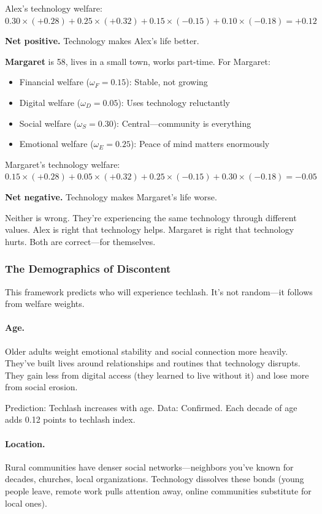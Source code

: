 Alex's technology welfare: $0.30 \times (+0.28) + 0.25 \times (+0.32) + 0.15 \times (-0.15) + 0.10 \times (-0.18) = +0.12$

\textbf{Net positive.} Technology makes Alex's life better.

\textbf{Margaret} is 58, lives in a small town, works part-time. For Margaret:
\begin{itemize}
    \item Financial welfare ($\omega_F = 0.15$): Stable, not growing
    \item Digital welfare ($\omega_D = 0.05$): Uses technology reluctantly
    \item Social welfare ($\omega_S = 0.30$): Central---community is everything
    \item Emotional welfare ($\omega_E = 0.25$): Peace of mind matters enormously
\end{itemize}

Margaret's technology welfare: $0.15 \times (+0.28) + 0.05 \times (+0.32) + 0.25 \times (-0.15) + 0.30 \times (-0.18) = -0.05$

\textbf{Net negative.} Technology makes Margaret's life worse.

Neither is wrong. They're experiencing the same technology through different 
values. Alex is right that technology helps. Margaret is right that technology 
hurts. Both are correct---for themselves.

\subsubsection{The Demographics of Discontent}

This framework predicts who will experience techlash. It's not random---it 
follows from welfare weights.

\paragraph{Age.}
Older adults weight emotional stability and social connection more heavily. 
They've built lives around relationships and routines that technology disrupts. 
They gain less from digital access (they learned to live without it) and 
lose more from social erosion.

Prediction: Techlash increases with age.
Data: Confirmed. Each decade of age adds 0.12 points to techlash index.

\paragraph{Location.}
Rural communities have denser social networks---neighbors you've known 
for decades, churches, local organizations. Technology dissolves these 
bonds (young people leave, remote work pulls attention away, online 
communities substitute for local ones).

